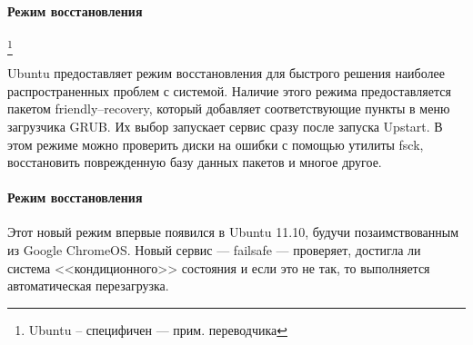 \paragraph{Режим восстановления} \footnote{Ubuntu -- специфичен --- прим. переводчика}

Ubuntu предоставляет режим восстановления для быстрого решения наиболее распространенных проблем с системой. Наличие этого режима предоставляется пакетом friendly--recovery, который добавляет соответствующие пункты в меню загрузчика GRUB. Их выбор запускает сервис  сразу после запуска Upstart. В этом режиме можно проверить диски на ошибки с помощью утилиты fsck, восстановить поврежденную базу данных пакетов и многое другое.
\paragraph{Режим восстановления}

Этот новый режим впервые появился в Ubuntu 11.10, будучи позаимствованным из Google ChromeOS. Новый сервис --- failsafe --- проверяет, достигла ли система <<кондиционного>> состояния и если это не так, то выполняется автоматическая перезагрузка. 
